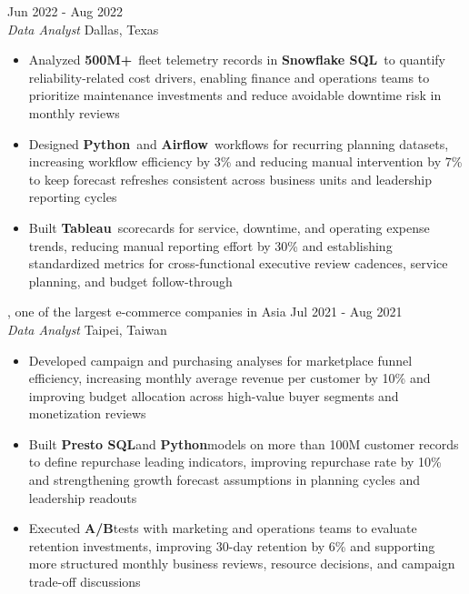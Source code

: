 \documentclass[11pt,letterpaper]{article}
\begin{document}
\vspace{0.42\baselineskip}
 \hfill Jun 2022 - Aug 2022\\[-1pt]
\textit{Data Analyst} \hfill Dallas, Texas
\begin{itemize}[leftmargin=1.5em, rightmargin=0pt, itemsep=0pt, topsep=0pt, parsep=0pt]
  \item \justifying Analyzed \textbf{500M+}\ fleet telemetry records in \textbf{Snowflake SQL}\ to quantify reliability-related cost drivers, enabling finance and operations teams to prioritize maintenance investments and reduce avoidable downtime risk in monthly reviews
  \item \justifying Designed \textbf{Python}\ and \textbf{Airflow}\ workflows for recurring planning datasets, increasing workflow efficiency by 3\% and reducing manual intervention by 7\% to keep forecast refreshes consistent across business units and leadership reporting cycles
  \item \justifying Built \textbf{Tableau}\ scorecards for service, downtime, and operating expense trends, reducing manual reporting effort by 30\% and establishing standardized metrics for cross-functional executive review cadences, service planning, and budget follow-through
\end{itemize}

\vspace{0.42\baselineskip}
, one of the largest e-commerce companies in Asia \hfill Jul 2021 - Aug 2021\\[-1pt]
\textit{Data Analyst} \hfill Taipei, Taiwan
\begin{itemize}[leftmargin=1.5em, rightmargin=0pt, itemsep=0pt, topsep=0pt, parsep=0pt]
  \item \justifying Developed campaign and purchasing analyses for marketplace funnel efficiency, increasing monthly average revenue per customer by 10\% and improving budget allocation across high-value buyer segments and monetization reviews
  \item \justifying Built \textbf{Presto SQL}\hspace{0.25em}and \textbf{Python}\hspace{0.25em}models on more than 100M customer records to define repurchase leading indicators, improving repurchase rate by 10\% and strengthening growth forecast assumptions in planning cycles and leadership readouts
  \item \justifying Executed \textbf{A/B}\hspace{0.25em}tests with marketing and operations teams to evaluate retention investments, improving 30-day retention by 6\% and supporting more structured monthly business reviews, resource decisions, and campaign trade-off discussions
\end{itemize}
\end{document}
